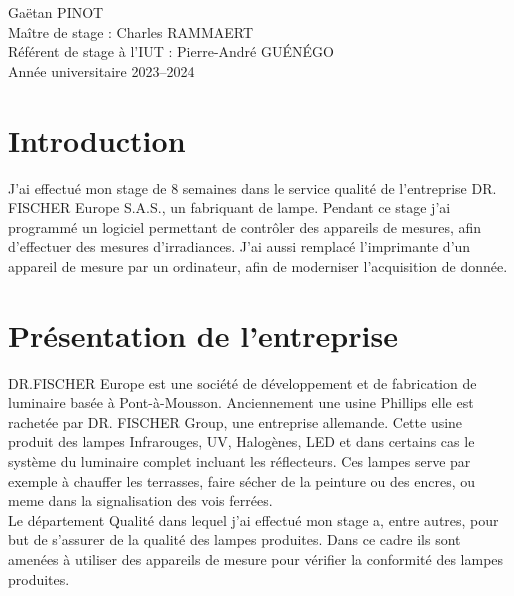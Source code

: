 \documentclass[12pt]{article}
\begin{document}
\vfill

{\Large
\noindent
Gaëtan PINOT\\
Maître de stage : Charles RAMMAERT\\
Référent de stage à l'IUT : Pierre-André GUÉNÉGO\\
Année universitaire 2023--2024
}


\thispagestyle{empty}

\newpage

\restoregeometry
\thispagestyle{empty}
\tableofcontents
\newpage
\onehalfspacing

\section{Introduction}

J'ai effectué mon stage de 8 semaines dans le service qualité de l'entreprise DR. FISCHER Europe S.A.S., un fabriquant de lampe.
Pendant ce stage j'ai programmé un logiciel permettant de contrôler des appareils de mesures, afin d'effectuer des mesures d'irradiances.
J'ai aussi remplacé l'imprimante d'un appareil de mesure par un ordinateur, afin de moderniser l'acquisition de donnée.


\newpage
\section{Présentation de l'entreprise}

DR.FISCHER Europe est une société de développement et de fabrication de luminaire basée à Pont-à-Mousson.
Anciennement une usine Phillips elle est rachetée par DR. FISCHER Group, une entreprise allemande.
Cette usine produit des lampes Infrarouges, UV, Halogènes, LED et dans certains cas le système du luminaire complet incluant les réflecteurs.
Ces lampes serve par exemple à chauffer les terrasses, faire sécher de la peinture ou des encres, ou meme dans la signalisation des vois ferrées.\\
Le département Qualité dans lequel j'ai effectué mon stage a, entre autres, pour but de s'assurer de la qualité des lampes produites.
Dans ce cadre ils sont amenées à utiliser des appareils de mesure pour vérifier la conformité des lampes produites.
\newpage
\end{document}
